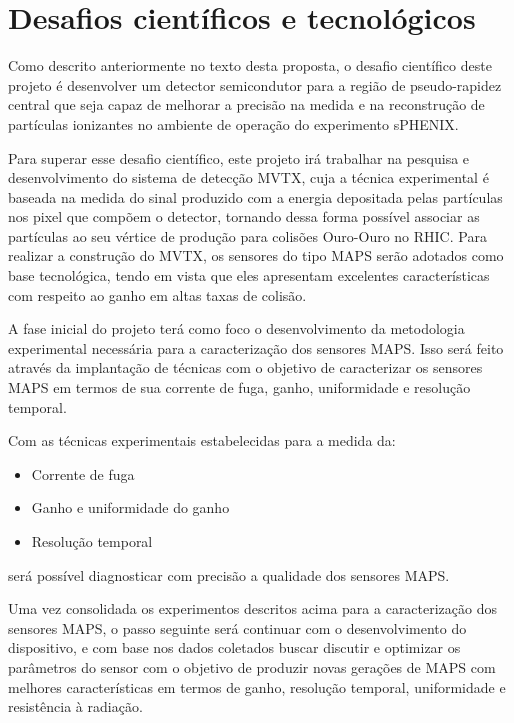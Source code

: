 \chapter{Desafios científicos e tecnológicos}

Como descrito anteriormente no texto desta proposta, o desafio científico deste projeto é desenvolver um detector semicondutor para a região de pseudo-rapidez central que seja capaz de melhorar a precisão na medida e na reconstrução de partículas ionizantes no ambiente de operação do experimento sPHENIX. 

Para superar esse desafio científico, este projeto irá trabalhar na pesquisa e desenvolvimento do sistema de detecção MVTX, cuja a técnica experimental é baseada na medida do sinal produzido com a energia depositada pelas partículas nos pixel que compõem o detector, tornando dessa forma possível associar as partículas ao seu vértice de produção para colisões Ouro-Ouro no RHIC. Para realizar a construção do MVTX, os sensores do tipo MAPS serão adotados como base tecnológica, tendo em vista que eles apresentam excelentes características com respeito ao ganho em altas taxas de colisão. 

A fase inicial do projeto terá como foco o desenvolvimento da metodologia experimental necessária para a caracterização dos sensores MAPS. Isso será feito através da implantação de técnicas  com o objetivo de caracterizar os sensores MAPS em termos de sua corrente de fuga, ganho, uniformidade e resolução temporal.

Com as técnicas experimentais estabelecidas para a medida da:

\begin{itemize}
\item Corrente de fuga
\item Ganho e uniformidade do ganho
\item Resolução temporal 
\end{itemize}
será possível diagnosticar com precisão a qualidade dos sensores MAPS.

Uma vez consolidada os experimentos descritos acima para a caracterização dos sensores MAPS, o passo seguinte será continuar com o desenvolvimento do dispositivo, e com base nos dados coletados buscar discutir e optimizar os parâmetros do sensor com o objetivo de produzir novas gerações de MAPS com melhores características em termos de ganho, resolução temporal, uniformidade e resistência à radiação. 

